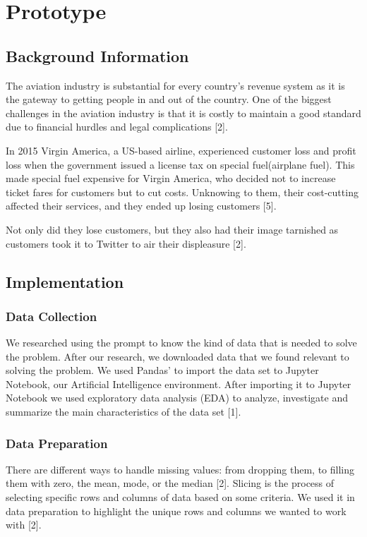 \documentclass[12pt,a4paper]{article}
\begin{document}
\section{Prototype}

\subsection{Background Information}

The aviation industry is substantial for every country’s revenue system as it is the gateway to getting people in and out of the country. One of the biggest challenges in the aviation industry is that it is costly to maintain a good standard due to financial hurdles and legal complications [2]. 

In 2015 Virgin America, a US-based airline, experienced customer loss and profit loss when the government issued a license tax on special fuel(airplane fuel). This made special fuel expensive for Virgin America, who decided not to increase ticket fares for customers but to cut costs. Unknowing to them, their cost-cutting affected their services, and they ended up losing customers [5]. 

Not only did they lose customers, but they also had their image tarnished as customers took it to Twitter to air their displeasure [2].

\subsection{Implementation}

\subsubsection{Data Collection}

We researched using the prompt to know the kind of data that is needed to solve the problem. After our research, we downloaded data that we found relevant to solving the problem. We used Pandas’ to import the data set to Jupyter Notebook, our Artificial Intelligence environment. After importing it to Jupyter Notebook we used exploratory data analysis (EDA) to analyze, investigate and summarize the main characteristics of the data set [1].

\subsubsection{Data Preparation}

There are different ways to handle missing values: from dropping them, to filling them with zero, the mean, mode, or the median [2]. Slicing is the process of selecting specific rows and columns of data based on some criteria. We used it in data preparation to highlight the unique rows and columns we wanted to work with [2].
\end{document}
